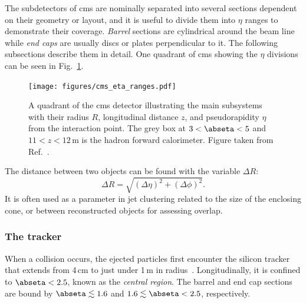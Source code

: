 The subdetectors of \acrshort{cms} are nominally separated into several sections dependent on their geometry or layout, and it is useful to divide them into $\eta$ ranges to demonstrate their coverage. \emph{Barrel} sections are cylindrical around the beam line while \emph{end caps} are usually discs or plates perpendicular to it. The following subsections describe them in detail. One quadrant of \acrshort{cms} showing the $\eta$ divisions can be seen in Fig.~\ref{fig:cms_eta_bounds}.

\begin{figure}[htbp]
    \centering
    \texttt{[image: figures/cms\_eta\_ranges.pdf]}
    \caption[A quadrant of the CMS detector illustrating the main subsystems with their radius, longitudinal distance, and pseudorapidity from the interaction point]{A quadrant of the \acrshort{cms} detector illustrating the main subsystems with their radius $R$, longitudinal distance $z$, and pseudorapidity $\eta$ from the interaction point. The grey box at $\text{3} < \abseta < \text{5}$ and $\text{11} < z < \text{12}$\,m is the hadron forward calorimeter. Figure taken from Ref.~.}
    \label{fig:cms_eta_bounds}
\end{figure}

The distance between two objects can be found with the variable $\Delta R$:
\begin{equation}
\Delta R = \sqrt{(\Delta \eta)^2 + (\Delta \phi)^2}.
\label{eq:delta_r}
\end{equation}
It is often used as a parameter in \gls{jet} clustering related to the size of the enclosing cone, or between reconstructed objects for assessing overlap.




\subsubsection{The tracker}
\label{subsubsec:cms_tracker}

When a collision occurs, the ejected particles first encounter the silicon tracker that extends from 4\,cm to just under 1\,m in radius~\cite{Karimäki:368412,CERN-LHCC-2000-016}. Longitudinally, it is confined to $\abseta < \text{2.5}$, known as the \emph{central region}. The barrel and end cap sections are bound by $\abseta \lesssim \text{1.6}$ and $\text{1.6} \lesssim \abseta < \text{2.5}$, respectively.

